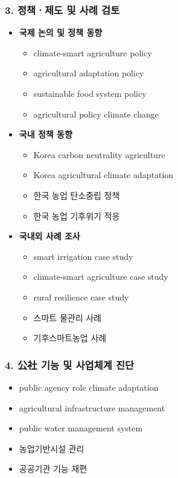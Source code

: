 \subsubsection*{3. 정책ㆍ제도 및 사례 검토}

\begin{itemize}

    \item \textbf{국제 논의 및 정책 동향}
    \begin{itemize}
        \item climate-smart agriculture policy
        \item agricultural adaptation policy
        \item sustainable food system policy
        \item agricultural policy climate change
    \end{itemize}

    \item \textbf{국내 정책 동향}
    \begin{itemize}
        \item Korea carbon neutrality agriculture
        \item Korea agricultural climate adaptation
        \item 한국 농업 탄소중립 정책
        \item 한국 농업 기후위기 적응
    \end{itemize}

    \item \textbf{국내외 사례 조사}
    \begin{itemize}
        \item smart irrigation case study
        \item climate-smart agriculture case study
        \item rural resilience case study
        \item 스마트 물관리 사례
        \item 기후스마트농업 사례
    \end{itemize}

\end{itemize}

\subsubsection*{4. 公社 기능 및 사업체계 진단}

\begin{itemize}
    \item public agency role climate adaptation
    \item agricultural infrastructure management
    \item public water management system
    \item 농업기반시설 관리
    \item 공공기관 기능 재편
\end{itemize}

